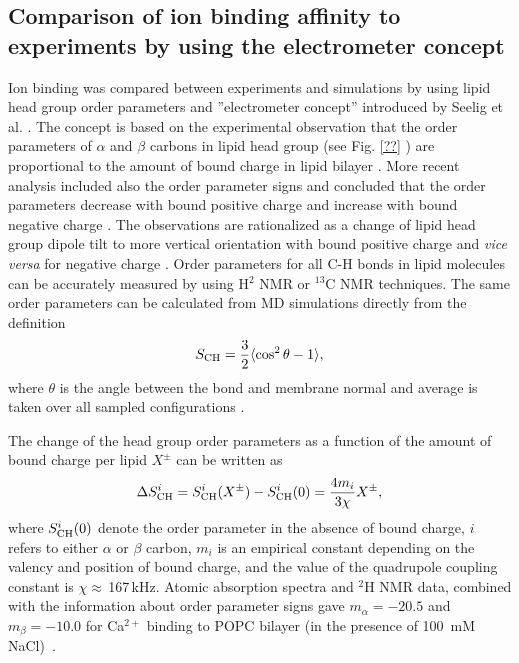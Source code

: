 \documentclass[aip,jcp,twocolumn]{revtex4}
\begin{document}
\subsection{Comparison of ion binding affinity to experiments by using the electrometer concept} \label{section:electrometer}
Ion binding was compared between experiments and simulations by 
using lipid head group order parameters and ''electrometer concept'' 
introduced by Seelig et al. \cite{seelig87,catte16}.
The concept is based on the experimental observation that the 
order parameters of $\alpha$ and $\beta$ carbons in lipid head group
(see Fig. \ref{??} 
) 
are proportional to the amount of bound charge
in lipid bilayer \cite{seelig87}.
More recent analysis included also
the order parameter signs and concluded that the order parameters  
decrease with bound positive charge and increase with bound negative 
charge \cite{ollila16,catte16}. The observations are rationalized 
as a change of lipid head group dipole tilt to more vertical orientation
with bound positive charge and {\it vice versa} for negative charge \cite{seelig87}. 
Order parameters for all C-H bonds in lipid molecules
can be accurately measured by using H$^2$ NMR or $^{13}$C NMR techniques.
The same order parameters can be calculated from MD simulations directly
from the definition
\begin{equation}\label{OP}
S_{\rm CH}=\frac{3}{2}\langle \cos^2\theta -1 \rangle,
\end{equation}
where $\theta$ is the angle between the bond and membrane
normal and average is taken over all sampled configurations \cite{ollila16}.


The change of the head group order parameters as a function of
the amount of bound charge per lipid $X^\pm$ 
can be written as~\cite{ferreira16}
\begin{equation}\label{OPchangeEQ}
\Delta S_{\rm{CH}}^{i}= S_{\rm{CH}}^{i}(X^\pm)-S_{\rm{CH}}^{i}(0) =\frac{4m_i }{3\chi}X^\pm,
\end{equation}
where $S_{\rm{CH}}^{i}(0)$ denote the order parameter in the absence of bound charge,
$i$ refers to either $\alpha$ or $\beta$ carbon,
$m_i$ is an empirical constant depending on the valency and position of bound charge,
and the value of the quadrupole coupling constant is $\chi \approx$\,167\,kHz.
Atomic absorption spectra and $^2$H NMR data, combined with the
information about order parameter signs gave
$m_\alpha=-20.5$  and $m_\beta=-10.0$ for Ca$^{2+}$ binding to POPC
bilayer (in the presence of 100~mM NaCl)~\cite{altenbach84,ollila16,catte16}.
\end{document}

